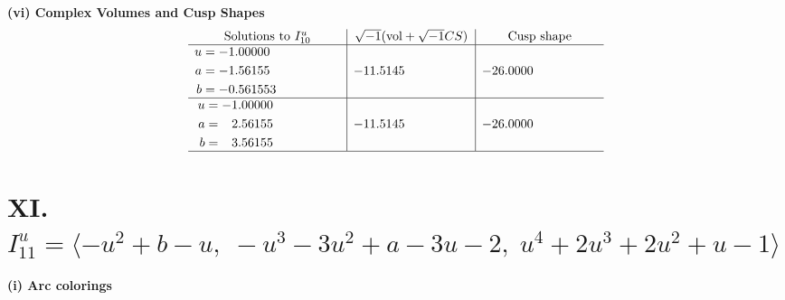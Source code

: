 \documentclass[1p]{elsarticle_modified}
\theoremstyle{definition}
\newcommand{\I}{\sqrt{-1}}
\begin{document}
\newpage\flushleft \textbf{(vi) Complex Volumes and Cusp Shapes}
$$\begin{array}{c|c|c}  
\text{Solutions to }I^u_{10}& \I (\text{vol} + \sqrt{-1}CS) & \text{Cusp shape}\\
 \hline 
\begin{aligned}
u &= -1.00000\phantom{ +0.000000I} \\
a &= -1.56155\phantom{ +0.000000I} \\
b &= -0.561553\phantom{ +0.000000I}\end{aligned}
 & -11.5145\phantom{ +0.000000I} & -26.0000\phantom{ +0.000000I} \\ \hline\begin{aligned}
u &= -1.00000\phantom{ +0.000000I} \\
a &= \phantom{-}2.56155\phantom{ +0.000000I} \\
b &= \phantom{-}3.56155\phantom{ +0.000000I}\end{aligned}
 & -11.5145\phantom{ +0.000000I} & -26.0000\phantom{ +0.000000I}\\
 \hline 
 \end{array}$$\newpage\newpage\renewcommand{\arraystretch}{1}
\centering \section*{XI. $I^u_{11}= \langle - u^2+b- u,\;- u^3-3 u^2+a-3 u-2,\;u^4+2 u^3+2 u^2+u-1 \rangle$}
\flushleft \textbf{(i) Arc colorings}\\
\end{document}
